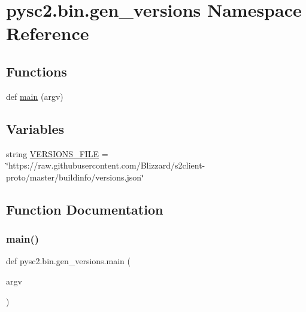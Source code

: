 \hypertarget{namespacepysc2_1_1bin_1_1gen__versions}{}\section{pysc2.\+bin.\+gen\+\_\+versions Namespace Reference}
\label{namespacepysc2_1_1bin_1_1gen__versions}
\subsection*{Functions}
\begin{DoxyCompactItemize}
\item 
def \mbox{\hyperlink{namespacepysc2_1_1bin_1_1gen__versions_a73bd9cab5040444eee1afe69e50677f0}{main}} (argv)
\end{DoxyCompactItemize}
\subsection*{Variables}
\begin{DoxyCompactItemize}
\item 
string \mbox{\hyperlink{namespacepysc2_1_1bin_1_1gen__versions_a6b226ed12402ca29fd0d08b34c3c9758}{V\+E\+R\+S\+I\+O\+N\+S\+\_\+\+F\+I\+LE}} = \char`\"{}https\+://raw.\+githubusercontent.\+com/Blizzard/s2client-\/proto/master/buildinfo/versions.\+json\char`\"{}
\end{DoxyCompactItemize}


\subsection{Function Documentation}
\mbox{\label{namespacepysc2_1_1bin_1_1gen__versions_a73bd9cab5040444eee1afe69e50677f0}} 
\subsubsection{\texorpdfstring{main()}{main()}}
{\footnotesize\ttfamily def pysc2.\+bin.\+gen\+\_\+versions.\+main (\begin{DoxyParamCaption}\item[{}]{argv }\end{DoxyParamCaption})}



